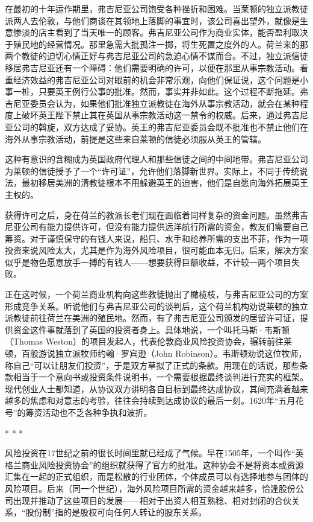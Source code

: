 \documentclass[12pt,oneside]{book}
\begin{document}
\begin{mdframed}
在最初的十年运作期里，弗吉尼亚公司饱受各种挫折和困难。当莱顿的独立派教徒派两人去伦敦，与他们商谈在其领地上落脚的事宜时，该公司喜出望外，就像是生意惨淡的店主看到了当天唯一的顾客。弗吉尼亚公司作为商业实体，能否盈利取决于殖民地的经营情况。那里急需大批孤注一掷，将生死置之度外的人。荷兰来的那两个教徒的迫切心情正好与弗吉尼亚公司的急迫心情不谋而合。不过，独立派信徒移居弗吉尼亚还有一个障碍：他们需要明确的许可，以便在那里从事宗教活动。看重经济效益的弗吉尼亚公司对眼前的机会非常乐观，向他们保证说，这个问题是小事一桩，只要英王例行公事的批准。然而，事实并非如此。这个过程不断拖延。弗吉尼亚委员会认为，如果他们批准独立派教徒在海外从事宗教活动，就会在某种程度上破坏英王陛下禁止其在英国从事宗教活动这一禁令的权威。后来，通过弗吉尼亚公司的斡旋，双方达成了妥协。英王的弗吉尼亚委员会既不批准也不禁止他们在海外从事宗教活动，前提是这些来自莱顿的信徒必须服从英王的管辖。

这种有意识的含糊成为英国政府代理人和那些信徒之间的中间地带。弗吉尼亚公司为莱顿的信徒授予了一个“许可证”，允许他们落脚新世界。实际上，不同于传统说法，最初移居美洲的清教徒根本不用躲避英王的迫害，他们是自愿向海外拓展英王主权的。

获得许可之后，身在荷兰的教派长老们现在面临着同样复杂的资金问题。虽然弗吉尼亚公司有能力提供许可，但没有能力提供远洋航行所需的资金，教友们需要自己筹资。对于谨慎保守的有钱人来说，船只、水手和给养所需的支出不菲，作为一项投资来说风险太大，尤其是作为海外风险项目，很可能血本无归。后来，解决方案似乎是物色愿意放手一搏的有钱人——想要获得巨额收益，不计较一两个项目失败。

正在这时候，一个荷兰商业机构向这些教徒抛出了橄榄枝，与弗吉尼亚公司的方案形成竞争关系。听说他们与弗吉尼亚公司的谈判后，这个荷兰机构劝说莱顿的独立派教徒前往荷兰在美洲的殖民地。然而，有了弗吉尼亚公司颁发的居留许可证，提供资金这件事就落到了英国的投资者身上。具体地说，一个叫托马斯·韦斯顿（Thomas Weston）的项目发起人，代表伦敦商业风险投资协会，辗转前往莱顿，百般游说独立派牧师约翰·罗宾逊（John Robinson）。韦斯顿劝说这位牧师，称自己“可以让朋友们投资”，于是双方草拟了正式的条款。用现在的话说，那些条款相当于一个意向书或投资条件说明书，一个需要根据最终谈判进行充实的框架。现代创业人士都知道，从协议双方讲明各自目标到最终达成协议，其间充满着越来越多的焦虑和对意志的考验，往往会持续到达成协议的最后一刻。1620年“五月花号”的筹资活动也不乏各种争执和波折。

\begin{center}
* * *
\end{center}

风险投资在17世纪之前的很长时间里就已经成了气候。早在1505年，一个叫作“英格兰商业风险投资协会”的组织就获得了官方的批准。这种协会不是将资本或资源汇集在一起的正式组织，而是松散的行业团体，个体成员可以有选择地参与团体的风险项目。后来（同一个世纪），海外风险项目所需的资金越来越多，恰逢股份公司出现并推动了这些项目的发展——相对于出资人相互熟稔、相对封闭的合伙关系，“股份制”指的是股权可向任何人转让的股东关系。


\end{mdframed}
\end{document}
